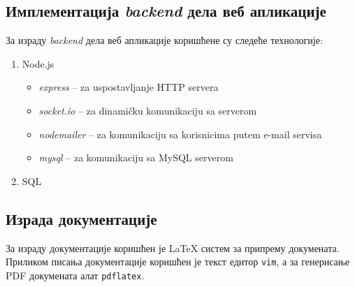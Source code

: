 \subsection{Имплементација \textit{backend} дела веб апликације}
За израду \textit{backend} дела веб апликације коришћене су
следеће технологије:
\begin{enumerate}
    \item Node.js
        \begin{itemize}
            \item \textit{express} -- za uspostavljanje HTTP servera
            \item \textit{socket.io} -- za dinamičku komunikaciju sa serverom
            \item \textit{nodemailer} -- za komunikaciju sa korisnicima putem e-mail servisa
            \item \textit{mysql} -- za komunikaciju sa MySQL serverom
        \end{itemize}
    \item SQL
\end{enumerate}

\subsection{Израда документације}
За израду документације коришћен је LaTeX систем за
припрему докумената. Приликом писања документације
коришћен је текст едитор \texttt{vim}, а за генерисање
PDF докумената алат \texttt{pdflatex}.

